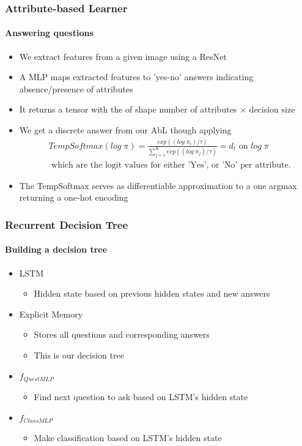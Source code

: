 \documentclass[9pt]{beamer}
\begin{document}
\begin{frame}
\frametitle{Attribute-based Learner}
\framesubtitle{Answering questions}
\begin{itemize}
	\item We extract features from a given image using a ResNet
	\item A MLP maps extracted features to 'yes-no' answers indicating absence/presence of attributes
	\item It returns a tensor with the of shape number of attributes $\times$ decision size
	\item We get a discrete answer from our AbL though applying \begin{align*}
	&TempSoftmax(log\;\pi) = \frac{exp((log\;\pi_i)/\tau)}{\sum_{j=1}^{K}exp((log\;\pi_j)/\tau)} = d_t
	\text{ on }
	log\;\pi \\
	&\text{ which are the logit values for either 'Yes', or 'No' per attribute.}
\end{align*}
\item The TempSoftmax serves as differentiable approximation to a one argmax returning a one-hot encoding
\end{itemize}
\end{frame}


\begin{frame}
\frametitle{Recurrent Decision Tree}
\framesubtitle{Building a decision tree}
\begin{itemize}
		\item LSTM
		\begin{itemize}
			\item Hidden state based on previous hidden states and new answers
		\end{itemize}
		\item Explicit Memory
		\begin{itemize}
			\item Stores all questions and corresponding answers
			\item This is our decision tree
		\end{itemize}
		\item $f_{QuestMLP}$
		\begin{itemize}
			\item Find next question to ask based on LSTM's hidden state
		\end{itemize}
		\item $f_{ClassMLP}$
		\begin{itemize}
			\item Make classification based on LSTM's hidden state
		\end{itemize}
\end{itemize}
\end{frame}
\end{document}
